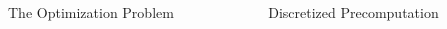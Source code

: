 \documentclass[final]{beamer}
\begin{document}
\begin{frame}{}
{\begin{columns}[t]
\begin{column}{.30\linewidth}
\begin{block}{\centering The Optimization Problem}
\begin{columns}[T]
\begin{column}{10cm}{}
\end{column}

\end{columns}

\end{block}


                        

 \end{column}
                        
        
        
\begin{column}{.30\linewidth}

\begin{block}{\centering Discretized Precomputation}


\end{block}
\end{column}
\end{columns}}
\end{frame}
\end{document}
